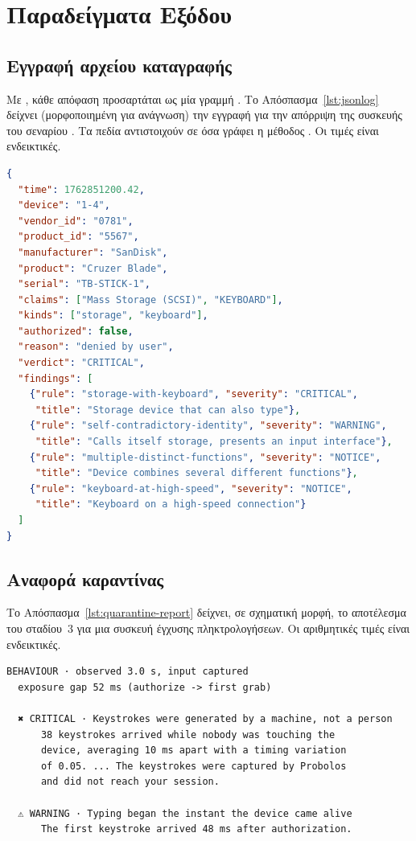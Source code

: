\chapter{Παραδείγματα Εξόδου}
\label{app:examples}

\section{Εγγραφή αρχείου καταγραφής }

Με , κάθε απόφαση προσαρτάται ως μία γραμμή . Το
Απόσπασμα~\ref{lst:jsonlog} δείχνει (μορφοποιημένη για ανάγνωση) την εγγραφή
για την απόρριψη της συσκευής του σεναρίου . Τα πεδία
αντιστοιχούν σε όσα γράφει η μέθοδος . Οι τιμές είναι
ενδεικτικές.

\begin{lstlisting}[language=json,caption={Ενδεικτική εγγραφή αρχείου καταγραφής για απόρριψη συσκευής.},label=lst:jsonlog]
{
  "time": 1762851200.42,
  "device": "1-4",
  "vendor_id": "0781",
  "product_id": "5567",
  "manufacturer": "SanDisk",
  "product": "Cruzer Blade",
  "serial": "TB-STICK-1",
  "claims": ["Mass Storage (SCSI)", "KEYBOARD"],
  "kinds": ["storage", "keyboard"],
  "authorized": false,
  "reason": "denied by user",
  "verdict": "CRITICAL",
  "findings": [
    {"rule": "storage-with-keyboard", "severity": "CRITICAL",
     "title": "Storage device that can also type"},
    {"rule": "self-contradictory-identity", "severity": "WARNING",
     "title": "Calls itself storage, presents an input interface"},
    {"rule": "multiple-distinct-functions", "severity": "NOTICE",
     "title": "Device combines several different functions"},
    {"rule": "keyboard-at-high-speed", "severity": "NOTICE",
     "title": "Keyboard on a high-speed connection"}
  ]
}
\end{lstlisting}

\section{Αναφορά καραντίνας}

Το Απόσπασμα~\ref{lst:quarantine-report} δείχνει, σε σχηματική μορφή, το
αποτέλεσμα του σταδίου~3 για μια συσκευή έγχυσης πληκτρολογήσεων. Οι
αριθμητικές τιμές είναι ενδεικτικές.

\begin{lstlisting}[caption={Σχηματική αναφορά σταδίου 3 για συσκευή που πληκτρολόγησε.},label=lst:quarantine-report]
BEHAVIOUR · observed 3.0 s, input captured
  exposure gap 52 ms (authorize -> first grab)

  ✖ CRITICAL · Keystrokes were generated by a machine, not a person
      38 keystrokes arrived while nobody was touching the
      device, averaging 10 ms apart with a timing variation
      of 0.05. ... The keystrokes were captured by Probolos
      and did not reach your session.

  ⚠ WARNING · Typing began the instant the device came alive
      The first keystroke arrived 48 ms after authorization.
\end{lstlisting}

